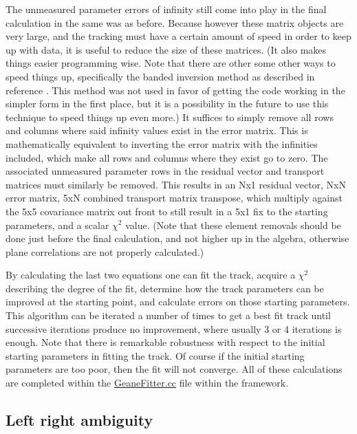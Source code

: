     The unmeasured parameter errors of infinity still come into play in the final calculation in the same was as before. Because however these matrix objects are very large, and the tracking must have a certain amount of speed in order to keep up with data, it is useful to reduce the size of these matrices. (It also makes things easier programming wise. Note that there are other some other ways to speed things up, specifically the banded inversion method as described in reference \cite{trajfit}. This method was not used in favor of getting the code working in the simpler form in the first place, but it is a possibility in the future to use this technique to speed things up even more.) It suffices to simply remove all rows and columns where said infinity values exist in the error matrix. This is mathematically equivalent to inverting the error matrix with the infinities included, which make all rows and columns where they exist go to zero. The associated unmeasured parameter rows in the residual vector and transport matrices must similarly be removed. This results in an Nx1 residual vector, NxN error matrix, 5xN combined transport matrix transpose, which multiply against the 5x5 covariance matrix out front to still result in a 5x1 fix to the starting parameters, and a scalar $\chi^2$ value. (Note that these element removals should be done just before the final calculation, and not higher up in the algebra, otherwise plane correlations are not properly calculated.)

    By calculating the last two equations one can fit the track, acquire a $\chi^{2}$ describing the degree of the fit, determine how the track parameters can be improved at the starting point, and calculate errors on those starting parameters. This algorithm can be iterated a number of times to get a best fit track until successive iterations produce no improvement, where usually 3 or 4 iterations is enough. Note that there is remarkable robustness with respect to the initial starting parameters in fitting the track. Of course if the initial starting parameters are too poor, then the fit will not converge. All of these calculations are completed within the \hyperref[sec:GeaneFitter]{GeaneFitter.cc} file within the framework.











\subsection{Left right ambiguity}
\label{sub:leftright}




